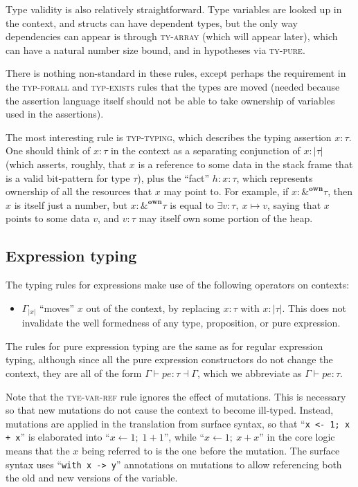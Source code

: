 \documentclass[acmsmall,nonacm]{acmart}
\newcommand{\core}[1]{\left| #1 \right|}
\newcommand{\proves}{\vdash}
\newcommand{\makes}{\dashv}
\begin{document}
Type validity is also relatively straightforward. Type variables are looked up in the context, and structs can have dependent types, but the only way dependencies can appear is through \textsc{ty-array} (which will appear later), which can have a natural number size bound, and in hypotheses via \textsc{ty-pure}.

There is nothing non-standard in these rules, except perhaps the requirement in the \textsc{typ-forall} and \textsc{typ-exists} rules that the types are moved (needed because the assertion language itself should not be able to take ownership of variables used in the assertions).

The most interesting rule is \textsc{typ-typing}, which describes the typing assertion $\boxed{x:\tau}$. One should think of $x:\tau$ in the context as a separating conjunction of $x:\core\tau$ (which asserts, roughly, that $x$ is a reference to some data in the stack frame that is a valid bit-pattern for type $\tau$), plus the ``fact'' $h:\boxed{x:\tau}$, which represents ownership of all the resources that $x$ may point to. For example, if $x:\&^\mathbf{own}\tau$, then $x$ is itself just a number, but $\boxed{x:\&^\mathbf{own}\tau}$ is equal to $\exists v:\tau,\ x\mapsto v$, saying that $x$ points to some data $v$, and $v:\tau$ may itself own some portion of the heap.

\subsection{Expression typing}

The typing rules for expressions make use of the following operators on contexts:

\begin{itemize}
  \item $\Gamma_{\core x}$ ``moves'' $x$ out of the context, by replacing $x:\tau$ with $x:\core\tau$. This does not invalidate the well formedness of any type, proposition, or pure expression.
\end{itemize}

The rules for pure expression typing are the same as for regular expression typing, although since all the pure expression constructors do not change the context, they are all of the form $\Gamma\proves pe:\tau\makes \Gamma$, which we abbreviate as $\Gamma\proves pe:\tau$.

Note that the \textsc{tye-var-ref} rule ignores the effect of mutations. This is necessary so that new mutations do not cause the context to become ill-typed. Instead, mutations are applied in the translation from surface syntax, so that ``\texttt{x <- 1; x + x}'' is elaborated into ``$x\gets 1;\;1+1$'', while ``$x\gets 1;\ x+x$'' in the core logic means that the $x$ being referred to is the one before the mutation. The surface syntax uses ``\texttt{with x -> y}'' annotations on mutations to allow referencing both the old and new versions of the variable.
\end{document}
